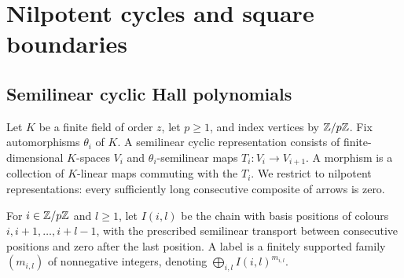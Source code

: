 \section{Nilpotent cycles and square boundaries}\label{sec:cycles}
\subsection{Semilinear cyclic Hall polynomials}
Let $K$ be a finite field of order $z$, let $p\ge1$, and index vertices by $\mathbb Z/p\mathbb Z$. Fix automorphisms $\theta_i$ of $K$. A semilinear cyclic representation consists of finite-dimensional $K$-spaces $V_i$ and $\theta_i$-semilinear maps $T_i:V_i\to V_{i+1}$. A morphism is a collection of $K$-linear maps commuting with the $T_i$. We restrict to nilpotent representations: every sufficiently long consecutive composite of arrows is zero.

For $i\in\mathbb Z/p\mathbb Z$ and $l\ge1$, let $I(i,l)$ be the chain with basis positions of colours $i,i+1,\ldots,i+l-1$, with the prescribed semilinear transport between consecutive positions and zero after the last position. A label is a finitely supported family $(m_{i,l})$ of nonnegative integers, denoting $\bigoplus_{i,l}I(i,l)^{m_{i,l}}$.


